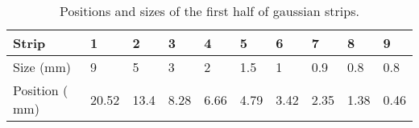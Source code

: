 \begin{table}[!ht]
  \centering
  \caption[Positions and sizes of the first half of gaussian strips]{Positions and sizes of the first half of gaussian strips.}
  \label{chap4:GaussianStrips}
  \begin{tabularx}{\linewidth}{lXXXXXXXXX}
    \toprule
    Strip    & 1     & 2    & 3    & 4    & 5    & 6    & 7    & 8    & 9    \\
    \midrule
    Size ($\mathrm{mm}$)    & 9     & 5    & 3    & 2    & 1.5  & 1    & 0.9  & 0.8  & 0.8  \\
    Position ($\mathrm{mm}$) & 20.52 & 13.4 & 8.28 & 6.66 & 4.79 & 3.42 & 2.35 & 1.38 & 0.46 \\
    \bottomrule
  \end{tabularx}
\end{table}
